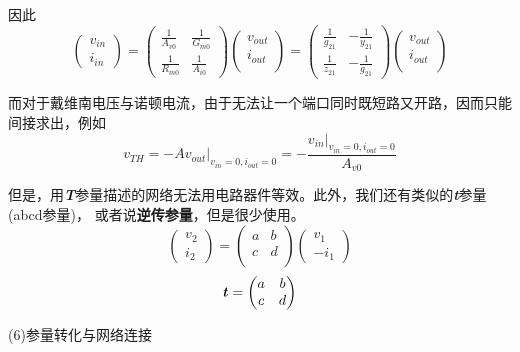     因此
    \[
        \begin{pmatrix}
            v_{in} \\ i_{in}
        \end{pmatrix}
        =
        \begin{pmatrix}
            \frac{1}{A_{v0}} & \frac{1}{G_{m0}} \\ \frac{1}{R_{m0}} & \frac{1}{A_{i0}}
        \end{pmatrix}
        \begin{pmatrix}
            v_{out} \\ i_{out} \\
        \end{pmatrix}
        =
        \begin{pmatrix}
            \frac{1}{g_{21}} & -\frac{1}{y_{21}} \\ \frac{1}{z_{21}} & -\frac{1}{g_{21}}
        \end{pmatrix}
        \begin{pmatrix}
            v_{out} \\ i_{out} \\
        \end{pmatrix}
    \]
    \par 而对于戴维南电压与诺顿电流，由于无法让一个端口同时既短路又开路，因而只能间接求出，例如
    \[
    v_{TH}=-Av_{out}|_{v_{in}=0,i_{out}=0}=-\frac{v_{in}|_{v_{in}=0,i_{out}=0}}{A_{v0}}
    \]
    \par 但是，用\textbf{\textit{T}}参量描述的网络无法用电路器件等效。此外，我们还有类似的\textbf{\textit{t}}参量(abcd参量)，
    或者说\textbf{逆传参量}，但是很少使用。
    \[
    \begin{pmatrix}
        v_2 \\ i_2
    \end{pmatrix}    
    =
    \begin{pmatrix}
        a & b \\ c & d \\
    \end{pmatrix}
    \begin{pmatrix}
        v_1 \\ -i_1
    \end{pmatrix}
    \]
    \[
    \textbf{\textit{t}}=
    \begin{pmatrix}
        a & b \\ c & d \\
    \end{pmatrix}    
    \]
    \par (6)参量转化与网络连接
